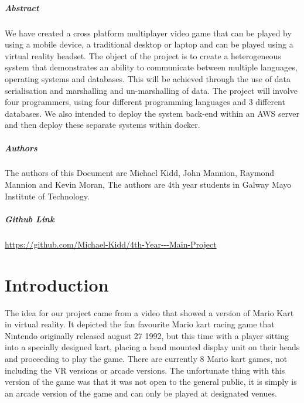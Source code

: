 
\newpage
\paragraph{Abstract}
We have created a cross platform multiplayer video game that can be played by using a mobile device, a traditional desktop or laptop and can be played using a virtual reality headset. The object of the project is to create a heterogeneous system that demonstrates an ability to communicate between multiple languages, operating systems and databases. This will be achieved through the use of data serialisation and marshalling and un-marshalling of data. The project will involve four programmers, using four different programming languages and 3 different databases. We also intended to deploy the system back-end within an AWS server and then deploy these separate systems within docker.

\paragraph{Authors}
The authors of this Document are Michael Kidd, John Mannion, Raymond Mannion and Kevin Moran, The authors are 4th year students in Galway Mayo Institute of Technology.

\paragraph{Github Link} \url{https://github.com/Michael-Kidd/4th-Year---Main-Project}

\chapter{Introduction}
The idea for our project came from a video that showed a version of Mario Kart in virtual reality. It depicted the fan favourite Mario kart racing game that Nintendo originally released august 27 1992, but this time with a player sitting into a specially designed kart, placing a head mounted display unit on their heads and proceeding to play the game. There are currently 8 Mario kart games, not including the VR versions or arcade versions. The unfortunate thing with this version of the game was that it was not open to the general public, it is simply is an arcade version of the game and can only be played at designated venues.\newline

